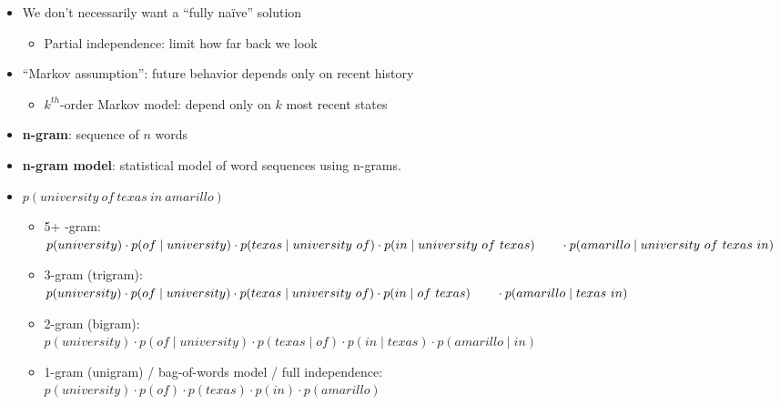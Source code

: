 \documentclass[11pt,letterpaper]{article}
\begin{document}
\begin{itemize}
  \item We don't necessarily want a ``fully na\"{i}ve'' solution
    \begin{itemize}
      \item Partial independence: limit how far back we look
    \end{itemize}
  \item ``Markov assumption'': future behavior depends only on recent history
    \begin{itemize}
      \item $k^{th}$-order Markov model: depend only on $k$ most recent states
    \end{itemize}
  \item \textbf{n-gram}: sequence of $n$ words
  \item \textbf{n-gram model}: statistical model of word sequences using n-grams.

  \item $p(university~of~texas~in~amarillo)$
    \begin{itemize}
      \item 5+ -gram: \\
            $p(university) \cdot 
             p(of \mid university) \cdot 
             p(texas \mid university~of) \cdot 
             p(in \mid university~of~texas) \\
      ~~~~~~ \cdot p(amarillo \mid university~of~texas~in)$
      \item 3-gram (trigram): \\
            $p(university) \cdot 
             p(of \mid university) \cdot 
             p(texas \mid university~of) \cdot 
             p(in \mid of~texas) \\
      ~~~~~~ \cdot p(amarillo \mid texas~in)$
      \item 2-gram (bigram): \\
            $p(university) \cdot 
             p(of \mid university) \cdot 
             p(texas \mid of) \cdot 
             p(in \mid texas) \cdot
             p(amarillo \mid in)$
      \item 1-gram (unigram) / bag-of-words model / full independence: \\
            $p(university) \cdot 
             p(of) \cdot 
             p(texas) \cdot 
             p(in) \cdot
             p(amarillo)$
    \end{itemize}


\end{itemize}
\end{document}
